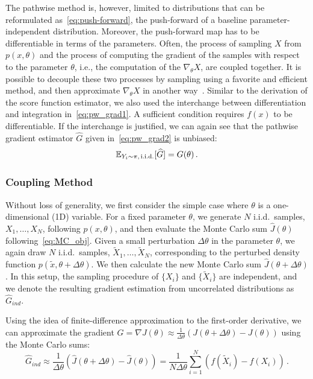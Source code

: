 \documentclass[12pt]{amsart}
\begin{document}
The pathwise method is, however, limited to distributions that can be reformulated as~\eqref{eq:push-forward}, the push-forward of a baseline parameter-independent distribution. Moreover, the push-forward map has to be differentiable in terms of the parameters. Often, the process of sampling $X$ from $p(x,\theta)$ and the process of computing the gradient of the samples with respect to the parameter $\theta$, i.e., the computation of the $\nabla_\theta X$, are coupled together. It is possible to decouple these two processes by sampling using a favorite and efficient method, and then approximate $\nabla_\theta X$ in another way~\cite[Sec.~5.3]{mohamed2019monte}. Similar to the derivation of the score function estimator, we also used the interchange between differentiation and integration in~\eqref{eq:pw_grad1}. A sufficient condition requires $f(x)$ to be differentiable. If the interchange is justified, we can again see that the pathwise gradient estimator $\widehat{G}$ given in~\eqref{eq:pw_grad2} is unbiased:
\[
\mathbb E_{Y_i\sim \pi,\, \text{i.i.d.}}[\widehat {G} ] = G(\theta)\,.
\]


\subsubsection{Coupling Method} \label{subsubsec:coupling}
Without loss of generality, we first consider the simple case where $\theta$ is a one-dimensional (1D) variable. For a fixed parameter $\theta$, we generate $N$ i.i.d.~samples, $X_1,\dots, X_N$,  following $p(x,\theta)$, and then evaluate the Monte Carlo sum $\widehat{J}(\theta)$ following~\eqref{eq:MC_obj}. Given a small perturbation $\Delta \theta$ in the parameter $\theta$, we again draw $N$  i.i.d.~samples, $\tilde X_1,\dots, \tilde  X_N$, corresponding to the perturbed density function $p(\tilde{x},\theta + \Delta \theta)$. We then calculate the new Monte Carlo sum $\widehat{J}(\theta + \Delta \theta)$. In this setup, the sampling procedure of $\{X_i\}$ and $\{\tilde X_i\}$ are independent, and we denote the resulting gradient estimation from uncorrelated distributions as $\widehat{G}_{ind}$.

Using the idea of finite-difference approximation to the first-order derivative, we can approximate the gradient $G = \nabla J(\theta) \approx \frac{1}{\Delta \theta} \left({J}(\theta + \Delta \theta) -  {J}(\theta) \right) $ using the Monte Carlo sums:
\begin{equation}\label{eq:cp_grad1}
\widehat{G}_{ind} \approx \frac{1}{\Delta \theta} \left(\widehat{J}(\theta + \Delta \theta) -  \widehat{J}(\theta) \right)=\frac{1}{N \Delta \theta} \sum_{i=1}^N \left( f(\tilde X_i) -  f(X_i)\right) \,.
\end{equation}
\end{document}

